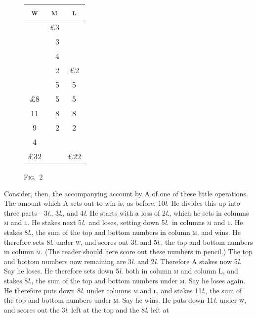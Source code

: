 \documentclass[letterpaper,12pt,oneside,openany]{memoir}
\begin{document}
\begin{wrapfigure}[15]{r}{1.3in}
    \begin{tabular}{|c|r|c|}
        \hline
        \textsc{w} & \multicolumn{1}{c|}{\textsc{m}} & \textsc{l} \\
        \hline
        \, & \pounds 3 & \, \\
        \, & 3         & \, \\
        \, & 4         & \, \\
        \cline{2-2}
        \, & 2         & \pounds 2 \\
        \, & 5         & 5 \\
        \pounds 8 & 5  & 5 \\
        11 & 8         & 8 \\
         9 & 2         & 2 \\
         4 & \,        & \, \\
        \hline
        \pounds 32 & \, & \pounds 22 \\
        \hline
    \end{tabular}
\begin{center}\textsc{Fig.~2}\end{center}
\end{wrapfigure}
Consider, then, the accompanying account by A of
one of these little operations. The amount which A sets
out to win is, as before, 10\textit{l}. He divides this up into
three parts---3\textit{l}., 3\textit{l}., and 4\textit{l}. He starts with a loss of
2\textit{l}., which he sets in columns \textsc{m} and \textsc{l}. He stakes next
5\textit{l}.\ and loses, setting down 5\textit{l}.\ in columns \textsc{m} and \textsc{l}. He
stakes 8\textit{l}., the sum of the top and bottom numbers in
column \textsc{m}, and wins. He therefore sets 8\textit{l}. under \textsc{w},
and scores out 3\textit{l}. and 5\textit{l}., the top
and bottom numbers in column \textsc{m}.
(The reader should here score out
these numbers in pencil.) The top
and bottom numbers now remaining
are 3\textit{l}. and 2\textit{l}. Therefore A stakes
now 5\textit{l}. Say he loses. He therefore
sets down 5\textit{l}. both in column \textsc{m}
and column \textsc{L}, and stakes 8\textit{l}., the
sum of the top and bottom numbers
under \textsc{m}. Say he loses again. He
therefore puts down 8\textit{l}. under columns \textsc{m} and \textsc{l}, and
stakes 11\textit{l}., the sum of the top and bottom numbers
under \textsc{m}. Say he wins. He puts down 11\textit{l}. under \textsc{w},
and scores out the 3\textit{l}. left at the top and the 8\textit{l}. left at
\end{document}

